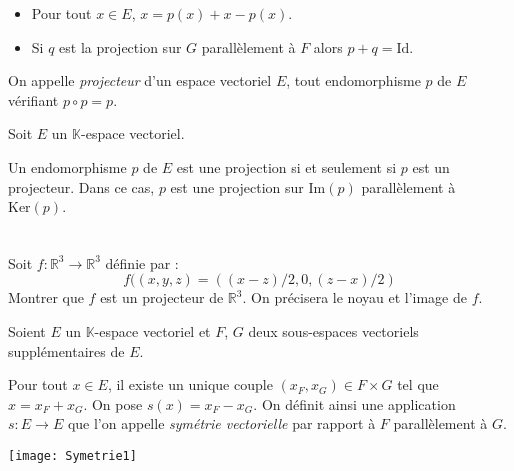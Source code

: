 \documentclass[a4paper,10pt]{report}
\begin{document}
\begin{Remarques}{}
\begin{itemize} 
\item Pour tout $x \in E$, $x=p(x)+x-p(x)$. 
\item Si $q$ est la projection sur $G$ parallèlement à $F$ alors $p+q=\textrm{Id}$.
\end{itemize}
\end{Remarques}{}

\begin{Definition}{} On appelle \emph{projecteur} d'un espace vectoriel $E$, tout endomorphisme $p$ de $E$ vérifiant $p \circ p = p$.
\end{Definition}

\begin{Proposition}{} Soit $E$ un $\mathbb{K}$-espace vectoriel.

Un endomorphisme $p$ de $E$ est une projection si et seulement si $p$ est un projecteur. Dans ce cas, $p$ est une projection sur $\textrm{Im}(p)$ parallèlement à $\textrm{Ker}(p)$.
\end{Proposition}

\begin{Demonstration}{}
\vspace{12cm}
\newpage

$\phantom{tes}$

\vspace{11cm}
\end{Demonstration}

\begin{ApplicationDirecte} Soit $f : \mathbb{R}^3 \rightarrow \mathbb{R}^3$ définie par :
$$ f((x,y,z)=((x-z)/2,0,(z-x)/2)$$
Montrer que $f$ est un projecteur de $\mathbb{R}^3$. On précisera le noyau et l'image de $f$.
\end{ApplicationDirecte}

\begin{Definition}{} Soient $E$ un $\mathbb{K}$-espace vectoriel et $F$, $G$ deux sous-espaces vectoriels supplémentaires de $E$.

Pour tout $x \in E$, il existe un unique couple $(x_F,x_G) \in F \times G$ tel que $x=x_F+x_G$. On pose \newline $s(x)=x_F-x_G$. On définit ainsi une application $s : E \rightarrow E$ que l'on appelle \emph{symétrie vectorielle} par rapport à $F$ parallèlement à $G$. 
\end{Definition}

\begin{center}
\texttt{[image: Symetrie1]}
\end{center}
\end{document}
